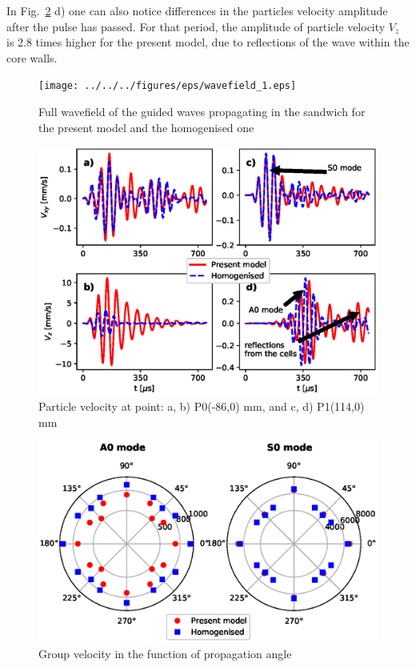 \documentclass[a4paper,12pt]{article}
\begin{document}
{In Fig.~\ref{fig:velocity} d) one can also notice differences in the particles velocity amplitude after the pulse has passed.
For that period, the amplitude of particle velocity \(V_z\) is 2.8 times higher for the present model, due to reflections of the wave within the core walls.

\label{comparison}
\begin{figure}
	\begin{center}
		\texttt{[image: ../../../figures/eps/wavefield\_1.eps]}
	\end{center}
	\caption{Full wavefield of the guided waves propagating in the sandwich for the present model and the homogenised one}
	\label{fig:wavefield}
\end{figure}
\begin{figure}
	\begin{center}
		\includegraphics[width=1\linewidth]{../../../figures/eps/velocity.eps}
	\end{center}
	\caption{Particle velocity at point: a, b) P0(-86,0) mm, and c, d) P1(114,0) mm}
	\label{fig:velocity}
\end{figure}
\begin{figure}
	\begin{center}
		\includegraphics[width=1\linewidth]{../../../figures/eps/cg.eps}
	\end{center}
	\caption{Group velocity in the function of propagation angle}
	\label{fig:speed}
\end{figure}

}
\end{document}
